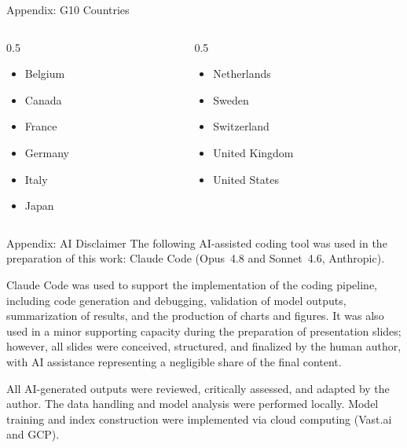 \documentclass[10pt]{beamer}
\begin{document}
\begin{frame}{Appendix: G10 Countries}
  \begin{columns}[T]
    \begin{column}{0.5\textwidth}
      \begin{itemize}
        \item Belgium
        \item Canada
        \item France
        \item Germany
        \item Italy
        \item Japan
      \end{itemize}
    \end{column}
    \begin{column}{0.5\textwidth}
      \begin{itemize}
        \item Netherlands
        \item Sweden
        \item Switzerland
        \item United Kingdom
        \item United States
      \end{itemize}
    \end{column}
  \end{columns}
\end{frame}

\begin{frame}{Appendix: AI Disclaimer}
  \small
  The following AI-assisted coding tool was used in the preparation of this
  work: Claude Code (Opus~4.8 and Sonnet~4.6, Anthropic).

  \medskip
  Claude Code was used to support the implementation of the coding pipeline,
  including code generation and debugging, validation of model outputs,
  summarization of results, and the production of charts and figures. It was
  also used in a minor supporting capacity during the preparation of
  presentation slides; however, all slides were conceived, structured, and
  finalized by the human author, with AI assistance representing a negligible
  share of the final content.

  \medskip
  All AI-generated outputs were reviewed, critically assessed, and adapted by
  the author. The data handling and model analysis were performed locally.
  Model training and index construction were implemented via cloud computing
  (Vast.ai and GCP).
\end{frame}
\end{document}
